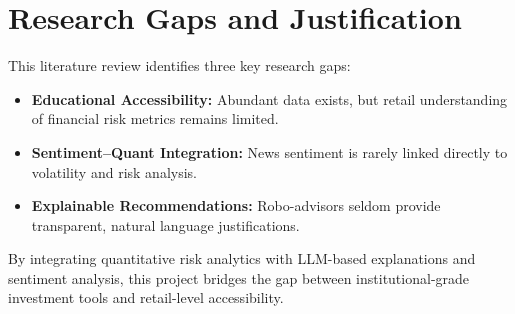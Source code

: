 \section{Research Gaps and Justification}

This literature review identifies three key research gaps:

\begin{itemize}
    \item \textbf{Educational Accessibility:} Abundant data exists, but retail understanding of financial risk metrics remains limited.
    \item \textbf{Sentiment--Quant Integration:} News sentiment is rarely linked directly to volatility and risk analysis.
    \item \textbf{Explainable Recommendations:} Robo-advisors seldom provide transparent, natural language justifications.
\end{itemize}

By integrating quantitative risk analytics with LLM-based explanations and sentiment analysis, this project bridges the gap between institutional-grade investment tools and retail-level accessibility.

